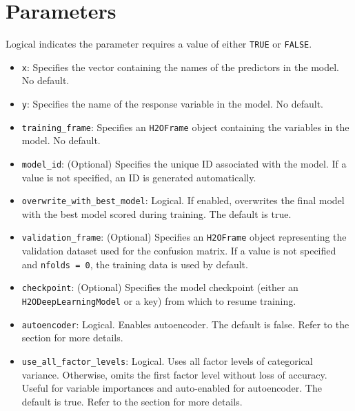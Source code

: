 {{{\section{Parameters}
\label{sec:Parameters}

Logical indicates the parameter requires a value of either \texttt{TRUE} or \texttt{FALSE}. 

\begin{itemize}

\item \texttt{x}: Specifies the vector containing the names of the predictors in the model. No default.

\item \texttt{y}: Specifies the name of the response variable in the model. No default.

\item \texttt{training\_frame}: Specifies an \texttt{H2OFrame} object containing the variables in the model.  No default.

\item \texttt{model\_id}: (Optional) Specifies the unique ID associated with the model. If a value is not specified, an ID is generated automatically. 

\item \texttt{overwrite\_with\_best\_model}: Logical. If enabled, overwrites the final model with the best model scored during training. The default is true.

\item \texttt{validation\_frame}: (Optional) Specifies an \texttt{H2OFrame} object representing the validation dataset used for the confusion matrix. If a value is not specified and \texttt{nfolds = 0}, the training data is used by default. 

\item \texttt{checkpoint}: (Optional) Specifies the model checkpoint (either an \\ \texttt{H2ODeepLearningModel} or a key) from which to resume training. 

\item \texttt{autoencoder}: Logical. Enables autoencoder. The default is false. Refer to the {\textbf{}} section for more details.

\item \texttt{use\_all\_factor\_levels}: Logical. Uses all factor levels of categorical variance. Otherwise, omits the first factor level without loss of accuracy. Useful for variable importances and auto-enabled for autoencoder.  The default is true. Refer to the {\textbf{}} section for more details.


\end{itemize}}}}
